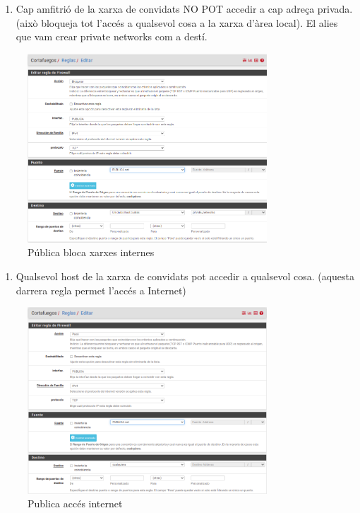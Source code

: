 \documentclass[
  10pt,
]{krantz}
\providecommand{\tightlist}{%
  \setlength{\itemsep}{0pt}\setlength{\parskip}{0pt}}
\begin{document}
\begin{enumerate}
\def\labelenumi{\arabic{enumi}.}
\setcounter{enumi}{2}
\tightlist
\item
  Cap amfitrió de la xarxa de convidats NO POT accedir a cap adreça privada. (això bloqueja tot l'accés a qualsevol cosa a la xarxa d'àrea local). El alies que vam crear private networks com a destí.
\end{enumerate}

\begin{figure}
\centering
\includegraphics[width=0.8\textwidth,height=\textheight]{imatges/proxmox/publica_regal2.png}
\caption{Pública bloca xarxes internes}
\end{figure}

\begin{enumerate}
\def\labelenumi{\arabic{enumi}.}
\setcounter{enumi}{3}
\tightlist
\item
  Qualsevol host de la xarxa de convidats pot accedir a qualsevol cosa. (aquesta darrera regla permet l'accés a Internet)
\end{enumerate}

\begin{figure}
\centering
\includegraphics[width=0.8\textwidth,height=\textheight]{imatges/proxmox/publica_regla3.png}
\caption{Publica accés internet}
\end{figure}
\end{document}
